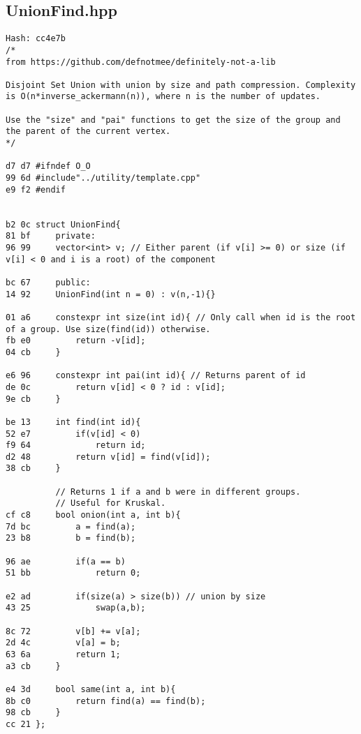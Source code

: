 \documentclass[11pt, a4paper, twoside]{article}
\begin{document}
\subsection{UnionFind.hpp}
\begin{lstlisting}
Hash: cc4e7b
/*
from https://github.com/defnotmee/definitely-not-a-lib

Disjoint Set Union with union by size and path compression. Complexity is O(n*inverse_ackermann(n)), where n is the number of updates.

Use the "size" and "pai" functions to get the size of the group and the parent of the current vertex.
*/

d7 d7 #ifndef O_O
99 6d #include"../utility/template.cpp"
e9 f2 #endif


b2 0c struct UnionFind{
81 bf     private:
96 99     vector<int> v; // Either parent (if v[i] >= 0) or size (if v[i] < 0 and i is a root) of the component
      
bc 67     public:
14 92     UnionFind(int n = 0) : v(n,-1){}
      
01 a6     constexpr int size(int id){ // Only call when id is the root of a group. Use size(find(id)) otherwise.
fb e0         return -v[id];
04 cb     }
      
e6 96     constexpr int pai(int id){ // Returns parent of id
de 0c         return v[id] < 0 ? id : v[id];
9e cb     }
      
be 13     int find(int id){
52 e7         if(v[id] < 0)
f9 64             return id;
d2 48         return v[id] = find(v[id]);
38 cb     }
      
          // Returns 1 if a and b were in different groups.
          // Useful for Kruskal.
cf c8     bool onion(int a, int b){
7d bc         a = find(a);
23 b8         b = find(b);
      
96 ae         if(a == b)
51 bb             return 0;
      
e2 ad         if(size(a) > size(b)) // union by size
43 25             swap(a,b);
      
8c 72         v[b] += v[a];
2d 4c         v[a] = b;
63 6a         return 1;
a3 cb     }
      
e4 3d     bool same(int a, int b){
8b c0         return find(a) == find(b);
98 cb     }
cc 21 };
\end{lstlisting}

\pagebreak
\end{document}
